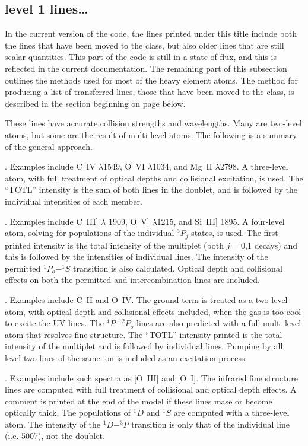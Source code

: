 \subsection{level 1 lines\ldots}

In the current version of the code, the lines printed under this title
include both the lines that have been moved to the
 class,
but also older lines that are still scalar quantities.
This part of the
code is still in a state of flux, and this is reflected in the current
documentation.
The remaining part of this subsection outlines the methods
used for most of the heavy element atoms.
The method for producing a list
of transferred lines,
those that have been moved to the  class, is
described in the section beginning on
page \pageref{sec:TransferredLines} below.

These lines have accurate collision strengths and wavelengths.
Many
are two-level atoms, but some are the result of multi-level atoms.
The
following is a summary of the general approach.

.  Examples include C~IV $\lambda $1549,
O~VI $\lambda $1034, and Mg~II $\lambda $2798.
A three-level atom, with full treatment of optical depths and collisional
excitation, is used.  The ``TOTL'' intensity is the sum of both lines in
the doublet, and is followed by the individual intensities of each member.

.  Examples include C~III] $\lambda$ 1909,
O~V] $\lambda $1215, and Si~III] 1895.
A four-level atom, solving for populations of the
individual $^3P_j$ states, is used.
The first printed intensity is the total intensity of the multiplet
(both $j=0$,1 decays) and this is followed by the intensities of
individual lines.
The intensity of the permitted $^1P_o - ^1S$ transition is also
calculated.  Optical depth and collisional effects on both the permitted
and intercombination lines are included.

.  Examples include C~II and O~IV.
The ground term is treated
as a two level atom, with optical depth and collisional effects included,
when the gas is too cool to excite the UV lines.
The $^4P -^2P_o$ lines are
also predicted with a full multi-level atom that resolves fine structure.
The ``TOTL'' intensity printed is the total intensity
of the multiplet and is
followed by individual lines.
Pumping by all level-two lines of the same
ion is included as an excitation process.

. Examples include such spectra as [O~III] and [O~I].
The infrared fine structure lines are computed with full treatment of
collisional and optical depth effects.
A comment is printed at the end
of the model if these lines mase or become optically thick.
The populations
of $^1D$ and $^1S$ are computed with a three-level atom.
The intensity of the
$^1D - ^3P$ transition is only that of the individual line
(i.e. 5007), not the doublet.

